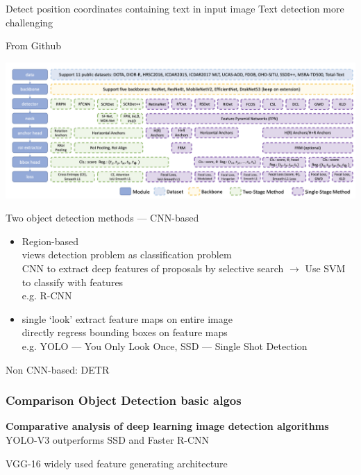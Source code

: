 Detect position coordinates containing text in input image
Text detection more challenging

From Github~\citep{noauthor_yangxue0827rotationdetection_nodate}

\includegraphics[width=\textwidth]{img/Detection-Modules.png}

Two object detection methods --- CNN-based
\begin{itemize}
    \item Region-based \\
        views detection problem as classification problem\\
        CNN to extract deep features of proposals by selective search $\rightarrow$  Use SVM to
            classify with features\\
        e.g. R-CNN
    \item  single `look'
        extract feature maps on entire image\\
        directly regress bounding boxes on feature maps\\
        e.g. YOLO --- You Only Look Once, SSD --- Single Shot Detection
\end{itemize}
Non CNN-based: DETR

\subsubsection*{Comparison Object Detection basic algos}
\textbf{Comparative analysis of deep learning image detection
algorithms}~\citep{srivastava_comparative_2021}
YOLO-V3 outperforms SSD and Faster R-CNN

VGG-16 widely used feature generating architecture

